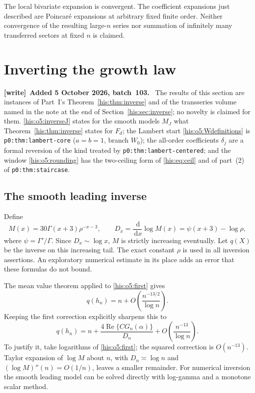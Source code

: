 \documentclass[11pt]{article}
\theoremstyle{remark}\newtheorem{remark}[theorem]{Remark}
\DeclareMathOperator{\Rea}{Re}
\newcommand{\dd}{\,\mathrm d}
\numberwithin{equation}{section}
\newenvironment{writenote}[1][]{\par\smallskip\begingroup\small
 \noindent\textbf{[write]}\if\relax\detokenize{#1}\relax\else~\textbf{#1.}\fi\ }%
 {\par\endgroup\smallskip}
\begin{document}
The local bivariate expansion is convergent. The coefficient expansions
just described are Poincar\'e expansions at arbitrary fixed finite order.
Neither convergence of the resulting large-$n$ series nor summation of
infinitely many transferred sectors at fixed $n$ is claimed.

\section{Inverting the growth law}\label{his:o5:invert}
\begin{writenote}[Added 5 October 2026, batch~103]
The results of this section are instances of Part~I's Theorem~\ref{his:thm:inverse} and of the transseries volume named in the note at the end of Section~\ref{his:sec:inverse}; no novelty is claimed for them. \eqref{his:o5:inverseJ} states for the smooth models $M_J$ what Theorem~\ref{his:thm:inverse} states for $F_d$; the Lambert start \eqref{his:o5:Wdefinitions} is \texttt{p0:thm:lambert-core} ($a=b=1$, branch $W_0$); the all-order coefficients $\delta_j$ are a formal reversion of the kind treated by \texttt{p0:thm:lambert-centered}; and the window \eqref{his:o5:rounding} has the two-ceiling form of \eqref{his:eq:ceil} and of part~(2) of \texttt{p0:thm:staircase}.
\end{writenote}

\subsection{The smooth leading inverse}
Define
\[
M(x)=30\Gamma(x+3)\rho^{-x-3},\qquad
D_x=\frac{\dd}{\dd x}\log M(x)=\psi(x+3)-\log\rho,
\]
where $\psi=\Gamma'/\Gamma$. Since $D_x\sim\log x$, $M$ is strictly
increasing eventually. Let $q(X)$ be the inverse on this increasing tail.
The exact constant $\rho$ is used in all inversion assertions.
An exploratory numerical estimate in its place adds an error that these
formulas do not bound.

The mean value theorem applied to \eqref{his:o5:first} gives
\begin{equation}\label{his:o5:inversebasic}
q(h_n)=n+O\!\left(\frac{n^{-13/2}}{\log n}\right).
\end{equation}
Keeping the first correction explicitly sharpens this to
\begin{equation}\label{his:o5:inversecorrection}
q(h_n)=n+\frac{4\Rea\{C G_n(\alpha)\}}{D_n}
+O\!\left(\frac{n^{-13}}{\log n}\right).
\end{equation}
To justify it, take logarithms of \eqref{his:o5:first}; the squared correction is
$O(n^{-13})$. Taylor expansion of $\log M$ about $n$, with
$D_n\asymp\log n$ and $(\log M)''(n)=O(1/n)$, leaves a smaller remainder.
For numerical inversion the smooth leading model can be solved directly
with log-gamma and a monotone scalar method.
\end{document}
